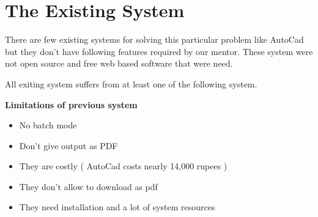 \section{The Existing System}
There are few existing systems for solving this particular problem like AutoCad but they don't have
following features required by our mentor. These system were not open source and free web based software 
that were need.


All exiting system suffers from at least one of the following system.  



{\bf {Limitations of previous system }}
\begin{itemize}
\item No batch mode 

\item Don't give output as PDF

\item They are costly ( AutoCad costs nearly 14,000 rupees )

\item They don't allow to download as pdf

\item They need installation and a lot of system resources 
 
\end{itemize}


